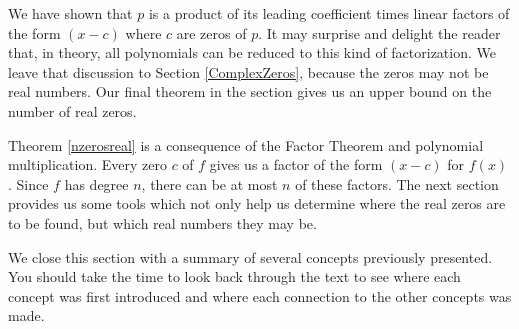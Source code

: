 We have shown that $p$ is a product of its leading coefficient times linear factors of the form $(x-c)$ where $c$ are zeros of $p$. It may surprise and delight the reader that, in theory, all polynomials can be reduced to this kind of factorization.  We leave that discussion to Section \ref{ComplexZeros}, because the zeros may not be real numbers.  Our final theorem in the section gives us an upper bound on the number of real zeros. 

\medskip


\medskip

Theorem \ref{nzerosreal} is a consequence of the Factor Theorem and polynomial multiplication.  Every zero $c$ of $f$ gives us a factor of the form $(x-c)$ for $f(x)$.  Since $f$ has degree $n$, there can be at most $n$ of these factors.  The next section provides us some tools which not only help us determine where the real zeros are to be found, but which real numbers they may be.

\medskip

We close this section with a summary of several concepts previously presented.  You should take the time to look back through the text to see where each concept was first introduced and where each connection to the other concepts was made.

\medskip


